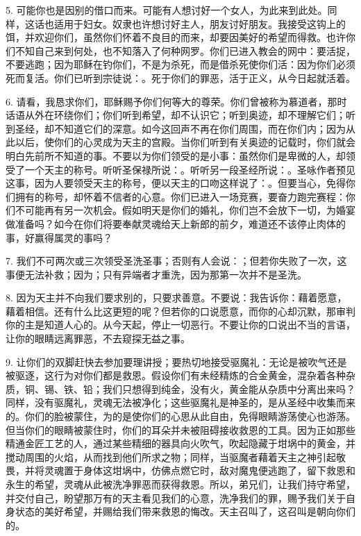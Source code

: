 5. 可能你也是因别的借口而来。可能有人想讨好一个女人，为此来到此处。同样，这话也适用于妇女。奴隶也许想讨好主人，朋友讨好朋友。我接受这钩上的饵，并欢迎你们，虽然你们怀着不良目的而来，却要因美好的希望而得救。也许你们不知自己来到何处，也不知落入了何种网罗。你们已进入教会的网中：要活捉，不要逃跑；因为耶稣在钓你们，不是为杀死，而是借杀死使你们活：因为你们必须死而复活。你们已听到宗徒说：。死于你们的罪恶，活于正义，从今日起就活着。\par

6. 请看，我恳求你们，耶稣赐予你们何等大的尊荣。你们曾被称为慕道者，那时话语从外在环绕你们；你们听到希望，却不认识它；听到奥迹，却不理解它们；听到圣经，却不知道它们的深意。如今这回声不再在你们周围，而在你们内；因为从此以后，使你们的心灵成为天主的宫殿。当你们听到有关奥迹的记载时，你们就会明白先前所不知道的事。不要以为你们领受的是小事：虽然你们是卑微的人，却领受了一个天主的称号。听听圣保禄所说：。听听另一段圣经所说：。圣咏作者预见这事，因为人要领受天主的称号，便以天主的口吻这样说了：。但要当心，免得你们拥有的称号，却怀着不信者的心意。你们已进入一场竞赛，要奋力跑完赛程：你们不可能再有另一次机会。假如明天是你们的婚礼，你们岂不会放下一切，为婚宴做准备吗？如今在你们将要奉献灵魂给天上新郎的前夕，难道还不该停止肉体的事，好赢得属灵的事吗？\par

7. 我们不可两次或三次领受圣洗圣事；否则有人会说：；但若你失败了一次，这事便无法补救；因为；只有异端者才重洗，因为那第一次并不是圣洗。\par

8. 因为天主并不向我们要求别的，只要求善意。不要说：我告诉你：藉着愿意，藉着相信。还有什么比这更短的呢？但若你的口说愿意，而你的心却沉默，那审判你的主是知道人心的。从今天起，停止一切恶行。不要让你的口说出不当的言语，让你的眼睛远离罪恶，不去窥探无益之事。\par

9. 让你们的双脚赶快去参加要理讲授；要热切地接受驱魔礼：无论是被吹气还是被驱逐，这行为对你们都是救恩。假设你们有未经精炼的合金黄金，混杂着各种杂质，铜、锡、铁、铅；我们只想得到纯金，没有火，黄金能从杂质中分离出来吗？同样，没有驱魔礼，灵魂无法被净化；这些驱魔礼是神圣的，是从圣经中收集而来的。你们的脸被蒙住，为的是使你们的心思从此自由，免得眼睛游荡使心也游荡。但当你们的眼睛被蒙住时，你们的耳朵并未被阻碍接收救恩的工具。因为正如那些精通金匠工艺的人，通过某些精细的器具向火吹气，吹起隐藏于坩埚中的黄金，并搅动周围的火焰，从而找到他们所求之物；同样，当驱魔者藉着天主之神引起敬畏，并将灵魂置于身体这坩埚中，仿佛点燃它时，敌对魔鬼便逃跑了，留下救恩和永生的希望，灵魂从此被洗净罪恶而获得救恩。所以，弟兄们，让我们持守希望，并交付自己，盼望那万有的天主看见我们的心意，洗净我们的罪，赐予我们关于自身状态的美好希望，并赐给我们带来救恩的悔改。天主召叫了，这召叫是朝向你们的。\par

